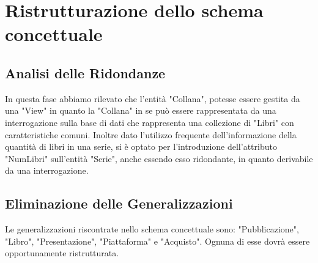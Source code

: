 \chapter{Ristrutturazione dello schema concettuale}

    \section{Analisi delle Ridondanze}

    In questa fase abbiamo rilevato che l'entità "Collana", potesse essere gestita da una "View" in quanto la "Collana" in se può essere rappresentata da una interrogazione sulla base di dati che rappresenta una collezione di "Libri" con caratteristiche comuni.
    Inoltre dato l'utilizzo frequente dell'informazione della quantità di libri in una serie, si è optato per l'introduzione dell'attributo "NumLibri" sull'entità "Serie", anche essendo esso ridondante, in quanto derivabile da una interrogazione.
    
    \section{Eliminazione delle Generalizzazioni}

    Le generalizzazioni riscontrate nello schema concettuale sono: "Pubblicazione", "Libro", "Presentazione", "Piattaforma" e "Acquisto". Ognuna di esse dovrà essere opportunamente ristrutturata.\\
    
